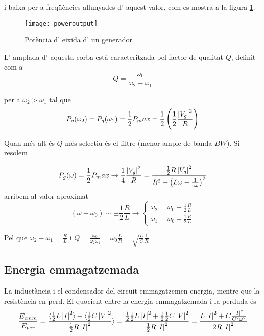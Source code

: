 i baixa per a freqüències allunyades d' aquest valor, com es mostra a la figura \cref{potplot}.

\begin{figure}[ht]
  \centering
  \texttt{[image: poweroutput]}
  \caption{Potència d' eixida d' un generador}
  \label{potplot}
\end{figure} 

L' amplada d' aquesta corba està caracteritzada pel factor de qualitat $Q$, definit com a 
\begin{equation}
  Q = \frac{\omega _ 0 }{\omega _2 - \omega _1}
\end{equation}

per a $\omega_2 > \omega _1$ tal que
\begin{equation}
P_g(\omega_2) = P_g (\omega _1 ) = \frac{1}{2} P_max = \frac{1}{2} \left ( \frac{1}{2} \frac{\left\rvert V_g \right\lvert ^2}{R} \right ) 
\end{equation}

Quan més alt és $Q$ més selectiu és el filtre (menor ample de banda $BW$). Si resolem

\begin{equation}
P_g(\omega) = \frac{1}{2} P_max \to \frac{1}{4}\frac{\left\rvert V_g \right\lvert ^2}{R} = \frac{\frac{1}{2} R \left\rvert  V_g \right\lvert ^2}{R^2 + \left(L \omega - \frac{1}{c\omega} \right)^2}
\end{equation}
arribem al valor aproximat 
\begin{equation}
  (\omega - \omega_0) \sim \pm \frac{1}{2}\frac{R}{L} \to 
  \left\{ 
  \begin{array}{lr}
    \omega _2 = \omega _0 + \frac{1}{2}\frac{R}{L} \\
    \omega _1 = \omega _0 - \frac{1}{2}\frac{R}{L} 
  \end{array}
  \right.
\end{equation}

Pel que $\omega_2 - \omega_1 = \frac{R}{L}$ i $Q = \frac{\omega _0}{\omega_2 \omega _1} = \omega _0 \frac{L}{R} = \sqrt{\frac{L}{C}}\frac{1}{R}$

\subsection{Energia emmagatzemada}

La inductància i el condensador del circuit emmagatzemen energia, mentre que la resistència en perd. El quocient entre la energia emmagatzemada i la perduda és
\begin{equation}
  \frac{E_{emm}}{E_{per}} = \frac{\langle \frac{1}{2} L \left\rvert I \right\lvert ^2 \rangle + \langle \frac{1}{2} C \left\rvert V \right\lvert ^2 }{\frac{1}{2} R \left\rvert I \right\lvert ^2} \rangle = \frac{\frac{1}{2} \frac{1}{2} L \left\rvert I \right\lvert ^2  + \frac{1}{2} \frac{1}{2} C \left\rvert V \right\lvert ^2 }{\frac{1}{2} R \left\rvert I \right\lvert ^2} = \frac{L \left\rvert I \right\lvert ^2 + C \frac{\left\rvert I \right\lvert^2}{C^2 \omega^2}}{2 R \left\rvert I \right\lvert ^2}
\end{equation}

